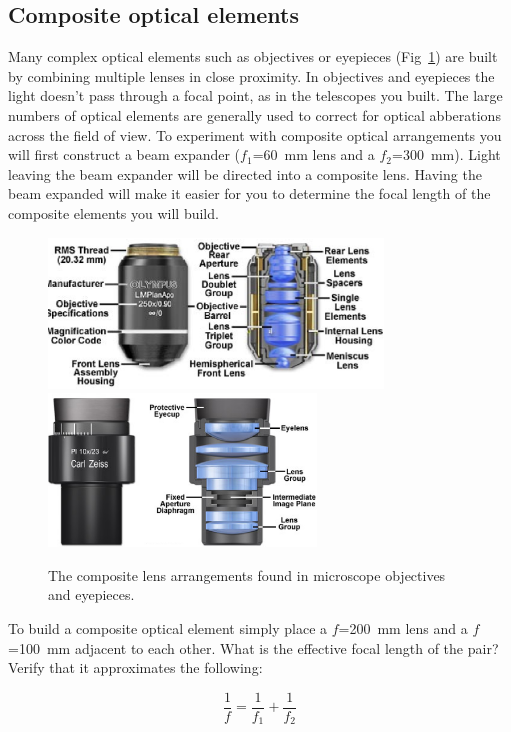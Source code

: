 \documentclass[a4paper]{report}
\begin{document}
\subsection{Composite optical elements}
Many complex optical elements such as objectives or eyepieces (Fig~\ref{composite}) are built by combining multiple lenses in close proximity. 
In objectives and eyepieces the light doesn't pass through a focal point, as in the telescopes you built. 
The large numbers of optical elements are generally used to correct for optical abberations across the field of view. 
To experiment with composite optical arrangements  you will first construct a beam expander ($f_1$=60~mm lens and a $f_2$=300~mm). 
Light leaving the beam expander will be directed into a composite lens. 
Having the beam expanded will make it easier for you to determine the focal length of the composite elements you will build.

\begin{figure}[h]
\center
\includegraphics[width=3.5in]{objectivesfigure1.eps}
\includegraphics[width=2.8in]{eyepieces5.eps}
\caption{The composite lens arrangements found in microscope
  objectives and eyepieces.}
\label{composite}
\end{figure}

To build a composite optical element simply place a $f$=200~mm lens and a $f$=100~mm adjacent to each other. 
What is the effective focal length of the pair? Verify that it approximates the following:

\begin{equation}
\frac{1}{f}=\frac{1}{f_1}+\frac{1}{f_2}
\label{eq:beamFocalLength}
\end{equation}
\end{document}
